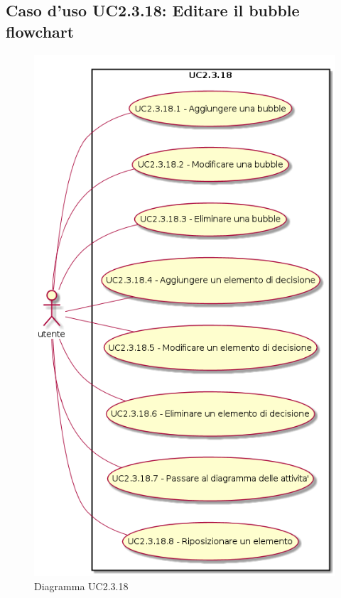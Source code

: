 \documentclass[../AnalisiDeiRequisiti.tex]{subfiles}
\begin{document}
					\subsection{Caso d'uso UC2.3.18: Editare il bubble flowchart}
					\begin{figure} [H]
						\centering
						\includegraphics[scale=0.45]{./Figures/UC2-3-18.png}
						\caption{Diagramma UC2.3.18}\label{}
					\end{figure}
\end{document}
